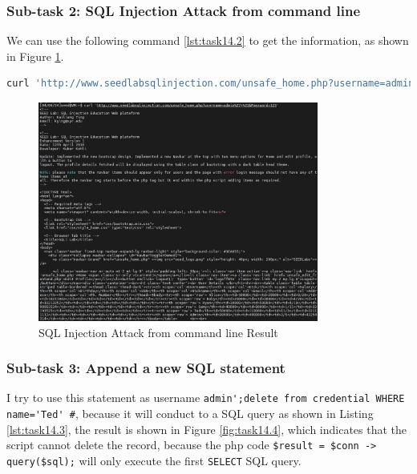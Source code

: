 \documentclass[a4paper,11pt]{article}
\begin{document}
\subsubsection{Sub-task 2: SQL Injection Attack from command line}
We can use the following command \ref{lst:task14.2} to get the information, as shown in Figure \ref{fig:task14.3}.
\begin{lstlisting}[caption={SQL Injection Command},label={lst:task14.2},language=BASH,breaklines=true]
curl 'http://www.seedlabsqlinjection.com/unsafe_home.php?username=admin%27+%23&Password=123'
\end{lstlisting}
\begin{figure}[h]
    \centering
       \includegraphics[width=0.82\textwidth]{figures/task14/task14.3.png}
    \caption{SQL Injection Attack from command line Result}\label{fig:task14.3}
\end{figure}

\subsubsection{Sub-task 3: Append a new SQL statement}

I try to use this statement as username \verb|admin';delete from credential WHERE name='Ted' #|, because it will conduct to a SQL query as shown in Listing \ref{lst:task14.3}, the result is shown in Figure \ref{fig:task14.4}, which indicates that the script cannot delete the record, because the php code \verb|$result = $conn -> query($sql);| will only execute the first \verb|SELECT| SQL query.
\end{document}
